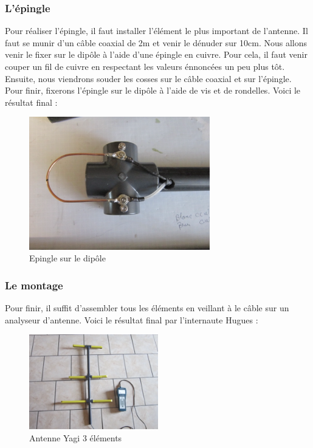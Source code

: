 \documentclass[12pt, a4paper]{article}
\begin{document}
\subsubsection{L'épingle}
Pour réaliser l'épingle, il faut installer l'élément le plus
important de l'antenne. Il faut se munir d'un câble 
coaxial de 2m et venir le dénuder sur 10cm. Nous allons 
venir le fixer sur le dipôle à l'aide d'une épingle
en cuivre. Pour cela, il faut venir couper un fil de
cuivre en respectant les valeurs énnoncées un peu plus 
tôt. Ensuite, nous viendrons souder les cosses sur le câble
coaxial et sur l'épingle. Pour finir,
fixerons l'épingle sur le dipôle à l'aide de vis et de
rondelles. Voici le résultat final :\\
\begin{figure}[h]
    \centering
    \includegraphics[width=0.7\textwidth]{img/dipole.png}
    \caption{Epingle sur le dipôle \cite{r5}}
    \label{fig:epingle}
\end{figure}

\subsubsection{Le montage}
Pour finir, il suffit d'assembler tous les éléments
en veillant à le câble sur un analyseur d'antenne.
Voici le résultat final par l'internaute Hugues :\\
\begin{figure}[h]
    \centering
    \includegraphics[width=0.5\textwidth]{img/fin.png}
    \caption{Antenne Yagi 3 éléments \cite{r5}}
    \label{fig:fin}
\end{figure}
\end{document}

